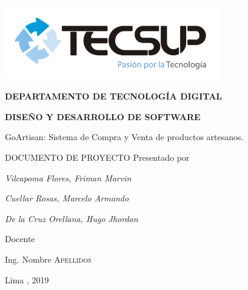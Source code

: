 \begin{titlepage}
	\centering
	\includegraphics[width=0.70\textwidth]{img/logo_tecsup_final}\par\vspace{1cm}
	\vspace{0.30cm}	
	{\scshape\large\bfseries DEPARTAMENTO DE TECNOLOG\'IA DIGITAL \par}
	\vspace{0.60cm}	
	{\scshape\large\bfseries DISEÑO Y DESARROLLO DE SOFTWARE  \par}
	\vspace{2.00cm}		
	{\large\large GoArtisan: Sistema de Compra y Venta de productos artesanos. \par}
	\vspace{0.60cm}
	{\scshape\large DOCUMENTO DE PROYECTO }
	\vspace{0.60cm}
	\vfill
	Presentado por \par
	{\large\itshape { Vilcapoma Flores, Friman Marvin }\par}
	{\large\itshape { Cuellar Rosas, Marcelo Armando }\par}
	{\large\itshape { De la Cruz Orellana, Hugo Jhordan }\par}
	\vspace{0.30cm}
	\vfill
	Docente \par
	Ing. Nombre  \textsc{ Apellidos}
	
  \vspace{0.30cm}
	\vfill
        {\large Lima , 2019 \par}
\end{titlepage}

